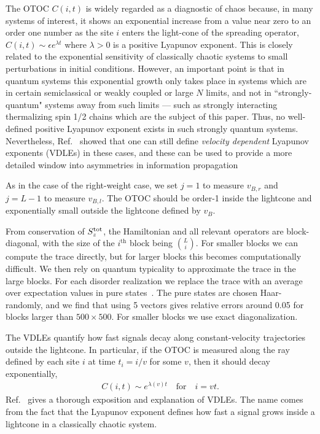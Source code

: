 \documentclass[aps,prx,reprint,superscriptaddress, longbibliography]{revtex4-1}
\newcommand{\charlie}[1]{{\color{Magenta}{{#1}}}}
\newcommand{\Sz}{S_z^{\rm tot}}
\begin{document}
The OTOC $C(i,t)$ is widely regarded as a diagnostic of chaos because, in many systems of interest, it shows an exponential increase from a value near zero to an order one number as the site $i$ enters the light-cone of the spreading operator, $C(i,t) \sim \epsilon e^{\lambda t}$ where $\lambda >0$ is a positive Lyapunov exponent. This is closely related to the exponential sensitivity of classically chaotic systems to small perturbations in initial conditions. However, an important point is that in quantum systems this exponential growth only takes place in systems which are in certain semiclassical or weakly coupled or large $N$ limits, and not in ``strongly-quantum" systems away from such limits --- such as strongly interacting thermalizing spin 1/2 chains which are the subject of this paper. Thus, no well-defined positive Lyapunov exponent exists in such strongly quantum systems. Nevertheless, Ref.~\cite{Khemani2018lambda} showed that one can still define \emph{velocity dependent} Lyapunov exponents (VDLEs) in these cases,  and these can be used to provide a more detailed window into asymmetries in information propagation 



As in the case of the right-weight case, we set $j=1$ to measure $v_{B,r}$ and $j=L-1$ to measure $v_{B,l}$. The OTOC should be order-1 inside the lightcone and exponentially small outside the lightcone defined by $v_B$. 




\charlie{Move this paragraph to an appendix?}
From conservation of $\Sz$, the Hamiltonian and all relevant operators are block-diagonal, with the size of the $i^\text{th}$ block being $\binom{L}{i}$. For smaller blocks we can compute the trace directly, but for larger blocks this becomes computationally difficult. We then rely on quantum typicality to approximate the trace in the large blocks. For each disorder realization we replace the trace with an average over expectation values in pure states~\cite{Luitz2017}. The pure states are chosen Haar-randomly, and we find that using 5 vectors gives relative errors around 0.05 for blocks larger than $500\times 500$. For smaller blocks we use exact diagonalization.

The VDLEs quantify how fast signals decay along constant-velocity trajectories outside the lightcone. In particular, if the OTOC is measured along the ray defined by each site $i$ at time $t_i = i/v$ for some $v$, then it should decay exponentially,
\begin{align}
C(i, t) \sim e^{\lambda(v)t}\quad\text{for}\quad i = vt.
\end{align}
Ref.~\cite{Khemani2018lambda} gives a thorough exposition and explanation of VDLEs. The name comes from the fact that the Lyapunov exponent defines how fast a signal grows inside a lightcone in a classically chaotic system. 
\end{document}
